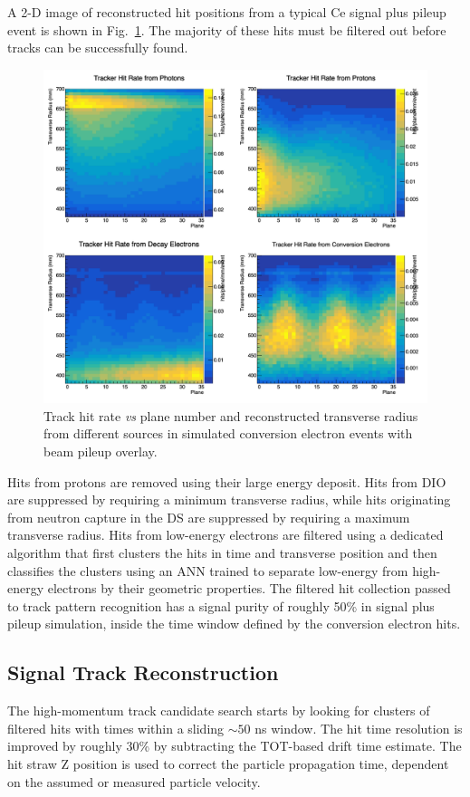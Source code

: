 A 2-D image of reconstructed hit positions from a typical Ce signal plus pileup event is shown in Fig.~\ref{fig:trackerhits}. The majority of these hits must be filtered out before tracks can be successfully found.
\begin{figure}[tbp]
 \centering
 \includegraphics[width=\textwidth]{figures/trackerhits.png}%
 \caption{Track hit rate {\it vs} plane number and reconstructed transverse radius from different sources in simulated conversion electron events with beam pileup overlay.
 }%
 \label{fig:trackerhits}
\end{figure}

Hits from protons are removed using their large energy deposit. Hits from DIO are suppressed by requiring a minimum transverse radius, while hits originating from neutron capture in the DS are suppressed by requiring a maximum transverse radius. Hits from low-energy electrons are filtered using a dedicated algorithm that first clusters the hits in time and transverse position and then classifies the clusters using an ANN trained to separate low-energy from high-energy electrons by their geometric properties. The filtered hit collection passed to track pattern recognition has a signal purity of roughly 50\% in signal plus pileup simulation, inside the time window defined by the conversion electron hits.

\subsection{Signal Track Reconstruction}
The high-momentum track candidate search starts by looking for clusters of filtered hits with times within a sliding $\sim 50$ ns window. The hit time resolution is improved by roughly 30\% by subtracting the TOT-based drift time estimate. The hit straw Z position is used to correct the particle propagation time, dependent on the assumed or measured particle velocity.

